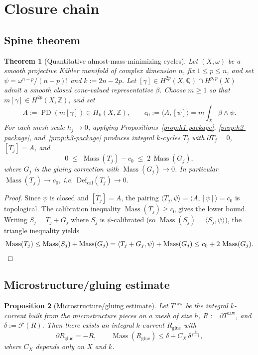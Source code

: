 \documentclass[11pt]{article}
\numberwithin{equation}{section}
\theoremstyle{plain}
\newtheorem{theorem}{Theorem}[section]
\newtheorem{proposition}[theorem]{Proposition}
\theoremstyle{definition}
\theoremstyle{remark}
\DeclareMathOperator{\Mass}{Mass}
\DeclareMathOperator{\PD}{PD}
\newcommand{\Z}{\mathbb{Z}}
\newcommand{\Q}{\mathbb{Q}}
\newcommand{\Def}{\mathrm{Def}}
\newcommand{\Defcal}{\Def_{\mathrm{cal}}}
\begin{document}
\section{Closure chain}\label{sec:closure}

\subsection*{Spine theorem}

\begin{theorem}[Quantitative almost-mass-minimizing cycles]
\label{thm:spine-quantitative}
Let $(X,\omega)$ be a smooth projective K\"ahler manifold of complex
dimension $n$, fix $1\le p\le n$, and set $\psi=\omega^{n-p}/(n-p)!$ and
$k:=2n-2p$.  Let $[\gamma]\in H^{2p}(X,\Q)\cap H^{p,p}(X)$ admit a smooth
closed cone-valued representative $\beta$.  Choose $m\ge 1$ so that
$m[\gamma]\in H^{2p}(X,\Z)$, and set
\[
A:=\PD(m[\gamma])\in H_k(X,\Z),
\qquad
c_0:=\langle A,[\psi]\rangle=m\int_X \beta\wedge\psi.
\]
For each mesh scale $h_j\to 0$, applying Propositions~\ref{prop:h1-package},
\ref{prop:h2-package}, and~\ref{prop:h3-package} produces integral $k$-cycles $T_j$ with
$\partial T_j=0$, $[T_j]=A$, and
\[
0\;\le\;\Mass(T_j)-c_0\;\le\;2\,\Mass(G_j),
\]
where $G_j$ is the gluing correction with $\Mass(G_j)\to 0$.
In particular $\Mass(T_j)\to c_0$, i.e.\ $\Defcal(T_j)\to 0$.
\end{theorem}

\begin{proof}
Since $\psi$ is closed and $[T_j]=A$, the pairing $\langle T_j,\psi\rangle
=\langle A,[\psi]\rangle=c_0$ is topological.  The calibration inequality
$\Mass(T_j)\ge c_0$ gives the lower bound.  Writing $S_j=T_j+G_j$ where
$S_j$ is $\psi$-calibrated (so $\Mass(S_j)=\langle S_j,\psi\rangle$), the
triangle inequality yields
\[
\Mass(T_j)\le \Mass(S_j)+\Mass(G_j)
=\langle T_j+G_j,\psi\rangle+\Mass(G_j)
\le c_0+2\,\Mass(G_j).
\qedhere
\]
\end{proof}


\subsection*{Microstructure/gluing estimate}

\begin{proposition}[Microstructure/gluing estimate]\label{prop:glue-gap}
Let $T^{\mathrm{raw}}$ be the integral $k$-current built from the
microstructure pieces on a mesh of size $h$, $R:=\partial T^{\mathrm{raw}}$,
and $\delta:=\mathcal F(R)$.  Then there exists an integral $k$-current
$R_{\mathrm{glue}}$ with
\[
\partial R_{\mathrm{glue}}=-R,
\qquad
\Mass(R_{\mathrm{glue}})\le \delta + C_X\,\delta^{\frac{k}{k-1}},
\]
where $C_X$ depends only on $X$ and $k$.
\end{proposition}
\end{document}

